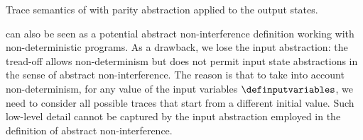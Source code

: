   \begin{marginfigure}[*2]
  \caption{Trace semantics of  with parity abstraction applied to the output states.}
  \end{marginfigure}

 can also be seen as a potential abstract non-interference definition working with non-deterministic programs.
As a drawback, we lose the input abstraction: the tread-off allows non-determinism but does not permit input state abstractions in the sense of abstract non-interference.
The reason is that to take into account non-determinism, for any value of the input variables $\definputvariables$, we need to consider all possible traces that start from a different initial value.
Such low-level detail cannot be captured by the input abstraction employed in the definition of abstract non-interference.

